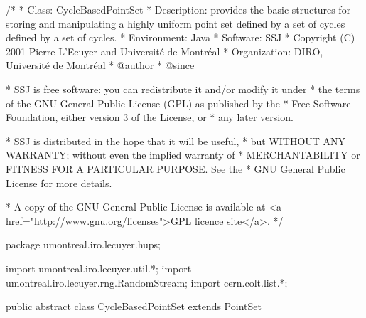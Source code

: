 \begin{code}
\begin{hide}
/*
 * Class:        CycleBasedPointSet
 * Description:  provides the basic structures for storing and manipulating
                 a highly uniform point set defined by a set of cycles
 defined by a set of cycles.
 * Environment:  Java
 * Software:     SSJ 
 * Copyright (C) 2001  Pierre L'Ecuyer and Université de Montréal
 * Organization: DIRO, Université de Montréal
 * @author       
 * @since

 * SSJ is free software: you can redistribute it and/or modify it under
 * the terms of the GNU General Public License (GPL) as published by the
 * Free Software Foundation, either version 3 of the License, or
 * any later version.

 * SSJ is distributed in the hope that it will be useful,
 * but WITHOUT ANY WARRANTY; without even the implied warranty of
 * MERCHANTABILITY or FITNESS FOR A PARTICULAR PURPOSE.  See the
 * GNU General Public License for more details.

 * A copy of the GNU General Public License is available at
   <a href="http://www.gnu.org/licenses">GPL licence site</a>.
 */
\end{hide}
package umontreal.iro.lecuyer.hups;\begin{hide}

import umontreal.iro.lecuyer.util.*;
import umontreal.iro.lecuyer.rng.RandomStream;
import cern.colt.list.*;
\end{hide}

public abstract class CycleBasedPointSet extends PointSet \begin{hide} {

   protected int numCycles = 0;     // Total number of cycles.
   // dim = Integer.MAX_VALUE;      // Dimension is infinite.
   private double[] shift;          // Random shift, initially null.
                                    // Entry j is for dimension j.
   protected ObjectArrayList cycles = new ObjectArrayList(); // List of cycles.

\end{hide}
\end{code}


